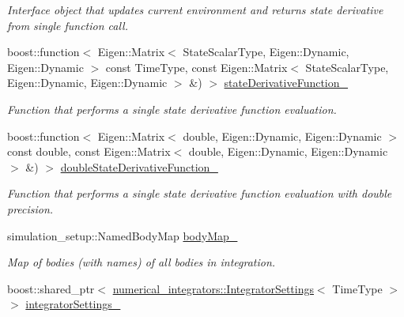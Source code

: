 \begin{DoxyCompactItemize}
\begin{DoxyCompactList}\small\item\em Interface object that updates current environment and returns state derivative from single function call. \end{DoxyCompactList}\item 
boost\+::function$<$ Eigen\+::\+Matrix$<$ State\+Scalar\+Type, Eigen\+::\+Dynamic, Eigen\+::\+Dynamic $>$ const Time\+Type, const Eigen\+::\+Matrix$<$ State\+Scalar\+Type, Eigen\+::\+Dynamic, Eigen\+::\+Dynamic $>$ \&) $>$ \hyperlink{classtudat_1_1propagators_1_1DynamicsSimulator_af70e7d7f3f0d4020ad5daba0b0d29a06}{state\+Derivative\+Function\+\_\+}
\begin{DoxyCompactList}\small\item\em Function that performs a single state derivative function evaluation. \end{DoxyCompactList}\item 
boost\+::function$<$ Eigen\+::\+Matrix$<$ double, Eigen\+::\+Dynamic, Eigen\+::\+Dynamic $>$ const double, const Eigen\+::\+Matrix$<$ double, Eigen\+::\+Dynamic, Eigen\+::\+Dynamic $>$ \&) $>$ \hyperlink{classtudat_1_1propagators_1_1DynamicsSimulator_a13c8abe9d1ec9edcfedd5ec6c37246ee}{double\+State\+Derivative\+Function\+\_\+}
\begin{DoxyCompactList}\small\item\em Function that performs a single state derivative function evaluation with double precision. \end{DoxyCompactList}\item 
simulation\+\_\+setup\+::\+Named\+Body\+Map \hyperlink{classtudat_1_1propagators_1_1DynamicsSimulator_a3ab03bb478e4dc680caced68aa0f4ad6}{body\+Map\+\_\+}\hypertarget{classtudat_1_1propagators_1_1DynamicsSimulator_a3ab03bb478e4dc680caced68aa0f4ad6}{}\label{classtudat_1_1propagators_1_1DynamicsSimulator_a3ab03bb478e4dc680caced68aa0f4ad6}

\begin{DoxyCompactList}\small\item\em Map of bodies (with names) of all bodies in integration. \end{DoxyCompactList}\item 
boost\+::shared\+\_\+ptr$<$ \hyperlink{classtudat_1_1numerical__integrators_1_1IntegratorSettings}{numerical\+\_\+integrators\+::\+Integrator\+Settings}$<$ Time\+Type $>$ $>$ \hyperlink{classtudat_1_1propagators_1_1DynamicsSimulator_af490bb03699859ec27f77b0dd869d1ff}{integrator\+Settings\+\_\+}\hypertarget{classtudat_1_1propagators_1_1DynamicsSimulator_af490bb03699859ec27f77b0dd869d1ff}{}\label{classtudat_1_1propagators_1_1DynamicsSimulator_af490bb03699859ec27f77b0dd869d1ff}


\end{DoxyCompactItemize}
